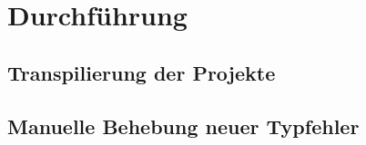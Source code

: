 \chapter{Durchführung}
\label{chap:execution}

\section{Transpilierung der Projekte}
\section{Manuelle Behebung neuer Typfehler}
